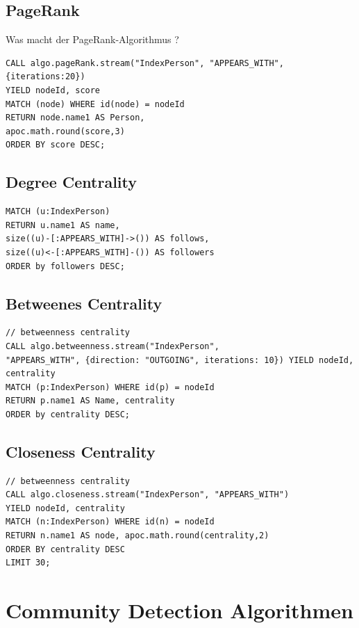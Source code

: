 \documentclass[ngerman,]{scrreprt}
\begin{document}
\subsection{PageRank}\label{pagerank}

Was macht der PageRank-Algorithmus ?

\begin{verbatim}
CALL algo.pageRank.stream("IndexPerson", "APPEARS_WITH",
{iterations:20})
YIELD nodeId, score
MATCH (node) WHERE id(node) = nodeId
RETURN node.name1 AS Person,
apoc.math.round(score,3)
ORDER BY score DESC;
\end{verbatim}

\subsection{Degree Centrality}\label{degree-centrality}

\begin{verbatim}
MATCH (u:IndexPerson)
RETURN u.name1 AS name,
size((u)-[:APPEARS_WITH]->()) AS follows,
size((u)<-[:APPEARS_WITH]-()) AS followers
ORDER by followers DESC;
\end{verbatim}

\subsection{Betweenes Centrality}\label{betweenes-centrality}

\begin{verbatim}
// betweenness centrality
CALL algo.betweenness.stream("IndexPerson",
"APPEARS_WITH", {direction: "OUTGOING", iterations: 10}) YIELD nodeId, centrality
MATCH (p:IndexPerson) WHERE id(p) = nodeId
RETURN p.name1 AS Name, centrality
ORDER by centrality DESC;
\end{verbatim}

\subsection{Closeness Centrality}\label{closeness-centrality}

\begin{verbatim}
// betweenness centrality
CALL algo.closeness.stream("IndexPerson", "APPEARS_WITH")
YIELD nodeId, centrality
MATCH (n:IndexPerson) WHERE id(n) = nodeId
RETURN n.name1 AS node, apoc.math.round(centrality,2)
ORDER BY centrality DESC
LIMIT 30;
\end{verbatim}

\section{Community Detection Algorithmen}\label{community-detection-algorithmen}
\end{document}
